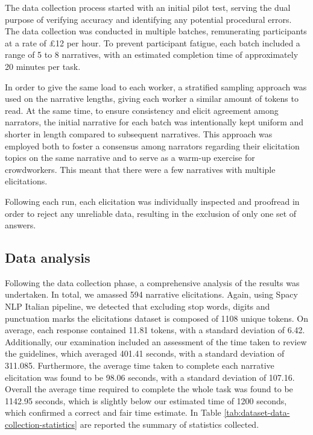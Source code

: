 The data collection process started with an initial pilot test, serving the dual purpose of verifying accuracy and identifying any potential procedural errors. The data collection was conducted in multiple batches, remunerating participants at a rate of £12 per hour. To prevent participant fatigue, each batch included a range of 5 to 8 narratives, with an estimated completion time of approximately 20 minutes per task.

In order to give the same load to each worker, a stratified sampling approach was used on the narrative lengths, giving each worker a similar amount of tokens to read. At the same time, to ensure consistency and elicit agreement among narrators, the initial narrative for each batch was intentionally kept uniform and shorter in length compared to subsequent narratives. This approach was employed both to foster a consensus among narrators regarding their elicitation topics on the same narrative and to serve as a warm-up exercise for crowdworkers. This meant that there were a few narratives with multiple elicitations.

Following each run, each elicitation was individually inspected and proofread in order to reject any unreliable data, resulting in the exclusion of only one set of answers.


\subsection{Data analysis}


Following the data collection phase, a comprehensive analysis of the results was undertaken. In total, we amassed 594 narrative elicitations. Again, using Spacy NLP Italian pipeline, we detected that excluding stop words, digits and punctuation marks the elicitations dataset is composed of 1108 unique tokens. On average, each response contained 11.81 tokens, with a standard deviation of 6.42. Additionally, our examination included an assessment of the time taken to review the guidelines, which averaged 401.41 seconds, with a standard deviation of 311.085. Furthermore, the average time taken to complete each narrative elicitation was found to be 98.06 seconds, with a standard deviation of 107.16. Overall the average time required to complete the whole task was found to be 1142.95 seconds, which is slightly below our estimated time of 1200 seconds, which confirmed a correct and fair time estimate. In Table \ref{tab:dataset-data-collection-statistics} are reported the summary of statistics collected. 

